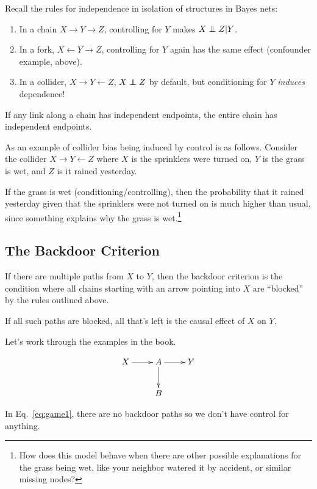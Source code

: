 \documentclass{article}
\begin{document}
Recall the rules for independence in isolation of structures in Bayes nets:

\begin{enumerate}
\item In a chain $X\rightarrow Y \rightarrow Z$, controlling for $Y$ makes $X\independent Z|Y$.
\item In a fork, $X\leftarrow Y \rightarrow Z$, controlling for $Y$ again has the same effect (confounder example, above).
\item In a collider, $X\rightarrow Y\leftarrow Z$, $X\independent Z$ by default, but conditioning for $Y$ \textit{induces} dependence!
\end{enumerate}

If any link along a chain has independent endpoints, the entire chain has independent endpoints.

As an example of collider bias being induced by control is as follows. Consider the collider $X\rightarrow Y\leftarrow Z$ where $X$ is the sprinklers were turned on, $Y$ is the grass is wet, and $Z$ is it rained yesterday.

If the grass is wet (conditioning/controlling), then the probability that it rained yesterday given that the sprinklers were not turned on is much higher than usual, since something explains why the grass is wet.\footnote{How does this model behave when there are other possible explanations for the grass being wet, like your neighbor watered it by accident, or similar missing nodes?}

\subsection{The Backdoor Criterion}

If there are multiple paths from $X$ to $Y$, then the backdoor criterion is the condition where all chains starting with an arrow pointing into $X$ are ``blocked'' by the rules outlined above.

If all such paths are blocked, all that's left is the causal effect of $X$ on $Y$.

Let's work through the examples in the book.

\begin{align} \label{eq:game1}
  \xymatrix{
  X\ar[r]& \ar[d]A\ar[r] &Y \\
  &B&
}
\end{align}

In Eq.~\ref{eq:game1}, there are no backdoor paths so we don't have control for anything.
\end{document}
